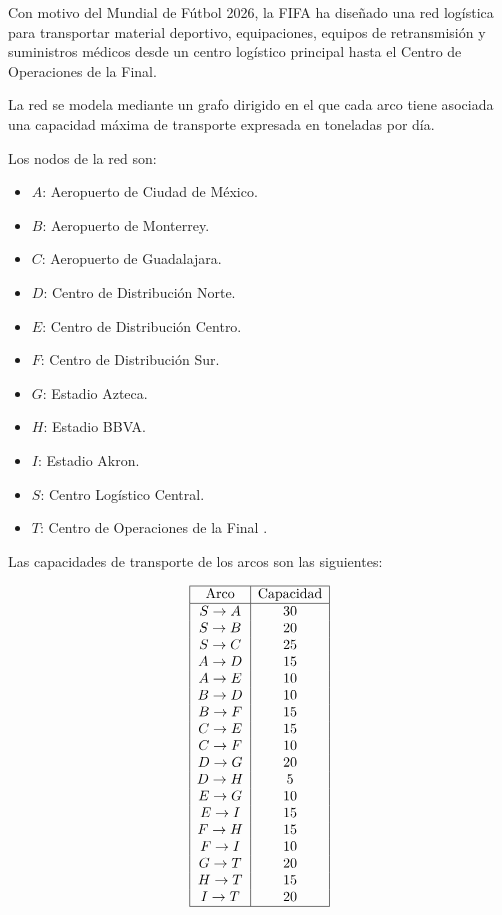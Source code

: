 Con motivo del Mundial de Fútbol 2026, la FIFA ha diseñado una red logística para transportar material deportivo, equipaciones, equipos de retransmisión y suministros médicos desde un centro logístico principal hasta el Centro de Operaciones de la Final.

La red se modela mediante un grafo dirigido en el que cada arco tiene asociada una capacidad máxima de transporte expresada en toneladas por día.

Los nodos de la red son:

\begin{itemize}
    \item $A$: Aeropuerto de Ciudad de México.
    \item $B$: Aeropuerto de Monterrey.
    \item $C$: Aeropuerto de Guadalajara.
    \item $D$: Centro de Distribución Norte.
    \item $E$: Centro de Distribución Centro.
    \item $F$: Centro de Distribución Sur.
    \item $G$: Estadio Azteca.
    \item $H$: Estadio BBVA.
    \item $I$: Estadio Akron.
    \item $S$: Centro Logístico Central.
    \item $T$: Centro de Operaciones de la Final .
\end{itemize}

Las capacidades de transporte de los arcos son las siguientes:

\[
\begin{array}{|c|c|}
\hline
\text{Arco} & \text{Capacidad} \\
\hline
S \rightarrow A & 30 \\
S \rightarrow B & 20 \\
S \rightarrow C & 25 \\
A \rightarrow D & 15 \\
A \rightarrow E & 10 \\
B \rightarrow D & 10 \\
B \rightarrow F & 15 \\
C \rightarrow E & 15 \\
C \rightarrow F & 10 \\
D \rightarrow G & 20 \\
D \rightarrow H & 5 \\
E \rightarrow G & 10 \\
E \rightarrow I & 15 \\
F \rightarrow H & 15 \\
F \rightarrow I & 10 \\
G \rightarrow T & 20 \\
H \rightarrow T & 15 \\
I \rightarrow T & 20 \\
\hline
\end{array}
\]

